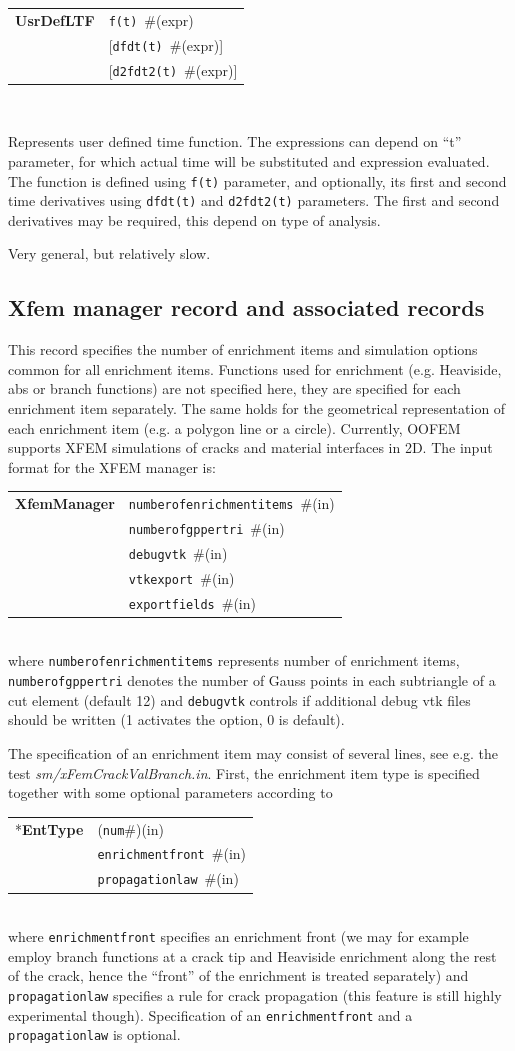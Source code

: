 \documentclass[a4paper]{article}
\makeatletter
\newcommand{\param}[1]{\texttt{#1}} %
\newcommand{\optional}[1]{[#1]} %
\newcommand{\field}[2]{\param{#1}~\#{\tiny(#2)}} %
\newcommand{\optField}[2]{\optional{\field{#1}{#2}}}
\newcommand{\componentNum}{(\param{num}\#){\tiny(in)}} %
\newcommand{\entKeyword}[1]{*\textbf{#1}} %
\newcommand{\entKeywordInst}[1]{\textbf{#1}} %
\newenvironment{record}[1][]{\begin{tabular}{|ll}}{\end{tabular}\\}
\newcommand{\recentry}[2]{{#1}&{#2}\\}
\newcounter{rcc}
\newenvironment{record}[1][\textwidth]{\setcounter{rcc}{0}\begin{tabular*}{#1}{|ll@{\extracolsep{\fill}}r}}{\end{tabular*}\\}
\newcommand{\recentry}[2]{\ifthenelse{\value{rcc}>0}{&$\backslash$ \\}{\setcounter{rcc}{1}}{#1}&{#2}}
\makeatother
\begin{document}
\begin{itemize}
\begin{record}[0.9\textwidth]
  \recentry{\entKeywordInst{UsrDefLTF}}{\field{f(t)}{expr}}
  \recentry{}{\optField{dfdt(t)}{expr}}
  \recentry{}{\optField{d2fdt2(t)}{expr}}
\end{record}

Represents user defined time function.
The expressions can depend on ``t'' parameter, for which actual time will be substituted and
expression evaluated. The function is defined using \param{f(t)} parameter, and optionally, its first and second time derivatives using \param{dfdt(t)} and \param{d2fdt2(t)} parameters.
The first and second derivatives may be required, this depend on type of analysis.

Very general, but relatively slow.
\end{itemize}

\subsection{Xfem manager record and associated records}
\label{_XFEMManagerRecords}
This record specifies the number of enrichment items and simulation options
common for all enrichment items. Functions used for enrichment (e.g. Heaviside,
abs or branch functions) are not specified here, they are specified for each
enrichment item separately. The same holds for the geometrical representation of
each enrichment item (e.g. a polygon line or a circle). Currently, OOFEM
supports XFEM simulations of cracks and material interfaces in 2D. The input
format for the XFEM manager is:\\
\begin{record}
  \recentry{\entKeywordInst{XfemManager}}{\field{numberofenrichmentitems}{in}}
  \recentry{}{\field{numberofgppertri}{in}}
  \recentry{}{\field{debugvtk}{in}}
  \recentry{}{\field{vtkexport}{in}}
  \recentry{}{\field{exportfields}{in}}
\end{record}
where \param{numberofenrichmentitems} represents number of enrichment items,
\param{numberofgppertri} denotes the number of Gauss points in each subtriangle
of a cut element (default 12) and \param{debugvtk} controls if additional debug
vtk files should be written (1 activates the option, 0 is default).

The specification of an enrichment item may consist of several lines, see e.g.
the test \textit{sm/xFemCrackValBranch.in}. First, the enrichment item type is
specified together with some optional parameters according to\\
\noindent
\begin{record}
  \recentry{\entKeyword{EntType}}{\componentNum}
  \recentry{}{\field{enrichmentfront}{in}}
  \recentry{}{\field{propagationlaw}{in}}
\end{record}
where \param{enrichmentfront} specifies an enrichment front (we may for example
employ branch functions at a crack tip and Heaviside enrichment along the rest
of the crack, hence the ``front'' of the enrichment is treated separately) and
\param{propagationlaw} specifies a rule for crack propagation (this feature is
still highly experimental though). Specification of an \param{enrichmentfront}
and a \param{propagationlaw} is optional.
\end{document}
